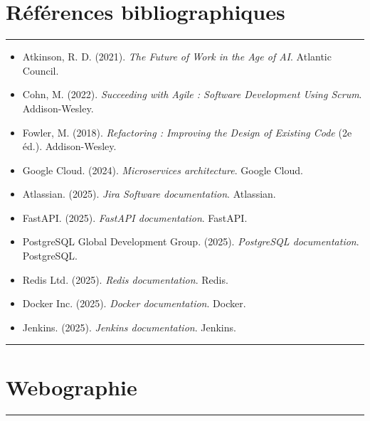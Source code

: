 \chapter*{Références bibliographiques}
\vspace{-0.5cm}

\noindent\rule{\linewidth}{0.4pt}
\vspace{0.5em}

\sloppy
\begin{itemize}
    \renewcommand{\labelitemi}{—}
    \item Atkinson, R. D. (2021). \textit{The Future of Work in the Age of AI}. Atlantic Council.
    \item Cohn, M. (2022). \textit{Succeeding with Agile : Software Development Using Scrum}. Addison-Wesley.
    \item Fowler, M. (2018). \textit{Refactoring : Improving the Design of Existing Code} (2e éd.). Addison-Wesley.
    \item Google Cloud. (2024). \textit{Microservices architecture}. Google Cloud.
    \item Atlassian. (2025). \textit{Jira Software documentation}. Atlassian.
    \item FastAPI. (2025). \textit{FastAPI documentation}. FastAPI.
    \item PostgreSQL Global Development Group. (2025). \textit{PostgreSQL documentation}. PostgreSQL.
    \item Redis Ltd. (2025). \textit{Redis documentation}. Redis.
    \item Docker Inc. (2025). \textit{Docker documentation}. Docker.
    \item Jenkins. (2025). \textit{Jenkins documentation}. Jenkins.
\end{itemize}
\fussy

\vspace{0.5em}
\noindent\rule{\linewidth}{0.4pt}

\newpage

\chapter*{Webographie}
\vspace{-0.5cm}

\noindent\rule{\linewidth}{0.4pt}
\vspace{0.5em}

